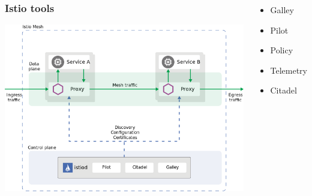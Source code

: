\documentclass[12pt]{beamer}
\begin{document}
            \begin{frame}
                \begin{columns}
                        \begin{center}
                            \frametitle{Istio tools}
                            \includegraphics[width=1\textwidth]{images/proxies.png}
                        \end{center}
    
                        \begin{itemize}
                            \pause
                            \item Galley
                            \pause
                            \item Pilot
                            \pause
                            \item Policy
                            \pause
                            \item Telemetry
                            \pause
                            \item Citadel
                        \end{itemize}
                    \end{columns}
                \end{frame}
\end{document}
